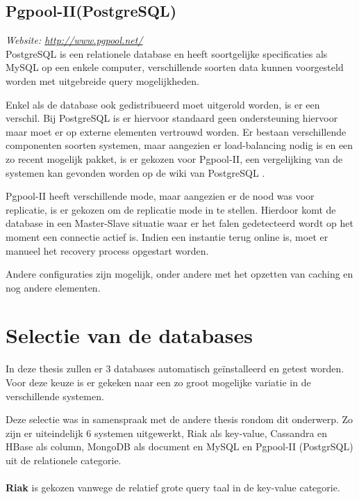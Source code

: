 \subsection{Pgpool-II(PostgreSQL)}
\textit{Website: \url{http://www.pgpool.net/}}\\
PostgreSQL is een relationele database en heeft soortgelijke specificaties als MySQL op een enkele computer, verschillende soorten data kunnen voorgesteld worden met uitgebreide query mogelijkheden. 

Enkel als de database ook gedistribueerd moet uitgerold worden, is er een verschil. Bij PostgreSQL is er hiervoor standaard geen ondersteuning hiervoor maar moet er op externe elementen vertrouwd worden. Er bestaan verschillende componenten soorten systemen, maar aangezien er load-balancing nodig is en een zo recent mogelijk pakket, is er gekozen voor Pgpool-II, een vergelijking van de systemen kan gevonden worden op de wiki van PostgreSQL \cite{postgresql-clustering}. 

Pgpool-II heeft verschillende mode, maar aangezien er de nood was voor replicatie, is er gekozen om de replicatie mode in te stellen. Hierdoor komt de database in een Master-Slave situatie waar er het falen gedetecteerd wordt op het moment een connectie actief is. Indien een instantie terug online is, moet er manueel het recovery process opgestart worden. 

Andere configuraties zijn mogelijk, onder andere met het opzetten van caching en nog andere elementen. 

\section{Selectie van de databases}
In deze thesis zullen er 3 databases automatisch geïnstalleerd en getest worden. Voor deze keuze is er gekeken naar een zo groot mogelijke variatie in de verschillende systemen.

Deze selectie was in samenspraak met de andere thesis rondom dit onderwerp. Zo zijn er uiteindelijk 6 systemen uitgewerkt, Riak als key-value, Cassandra en HBase als column, MongoDB als document en MySQL en Pgpool-II (PostgrSQL) uit de relationele categorie.

\paragraph{} \textbf{Riak} is gekozen vanwege de relatief grote query taal in de key-value categorie. 

